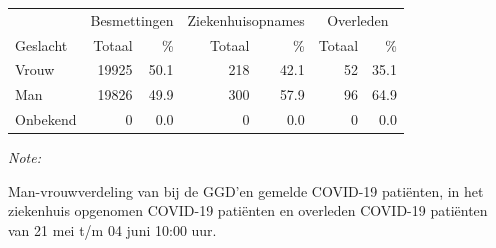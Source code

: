 \documentclass[
  english,
  man,floatsintext]{apa6}
\begin{document}
\begin{table}
\centering\begingroup\fontsize{11}{13}\selectfont

\begin{threeparttable}
\begin{tabular}{lrrrrrr}
\toprule
\multicolumn{1}{c}{ } & \multicolumn{2}{c}{Besmettingen} & \multicolumn{2}{c}{Ziekenhuisopnames} & \multicolumn{2}{c}{Overleden} \\
\cmidrule(l{3pt}r{3pt}){2-3} \cmidrule(l{3pt}r{3pt}){4-5} \cmidrule(l{3pt}r{3pt}){6-7}
Geslacht & Totaal & \% & Totaal & \% & Totaal & \%\\
\midrule
Vrouw & 19925 & 50.1 & 218 & 42.1 & 52 & 35.1\\
Man & 19826 & 49.9 & 300 & 57.9 & 96 & 64.9\\
Onbekend & 0 & 0.0 & 0 & 0.0 & 0 & 0.0\\
\bottomrule
\end{tabular}
\begin{tablenotes}
\item \textit{Note: } 
\item Man-vrouwverdeling van bij de GGD’en gemelde COVID-19 patiënten, in het ziekenhuis opgenomen COVID-19 patiënten en overleden COVID-19 patiënten van 21 mei t/m 04 juni 10:00 uur.
\end{tablenotes}
\end{threeparttable}
\endgroup{}
\end{table}
\newpage
\end{document}
